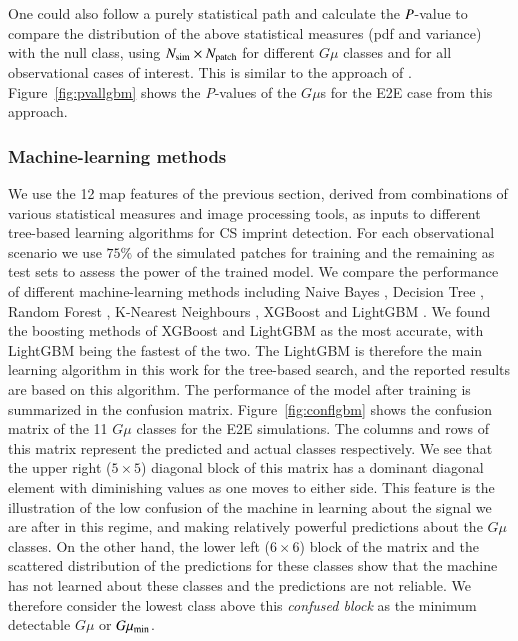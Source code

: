\documentclass[fleqn,usenatbib]{mnras}
\begin{document}
%
One could also follow a purely statistical path and calculate the ${\it P}$-value to compare the distribution of the above statistical measures (pdf and variance) 
 with the null class, using $N_{\rm sim} \times N_{\rm patch}$ for different $G\mu$ classes and for all observational cases of interest. 
This is similar to the approach of \cite{vaf18}. 
Figure~\ref{fig:pvallgbm} shows the {\it P}-values of the $G\mu$s for the E2E case from this approach.
\subsubsection{Machine-learning methods}\label{sec:MLmethod}
We use the 12 map features of the previous section, derived from combinations of various statistical measures and image processing tools, as inputs to different tree-based learning algorithms for CS imprint detection.
For each observational scenario we use $75\%$ of the simulated patches for training  and the remaining as test sets to assess the power of the trained model.
%
We compare the performance of different machine-learning methods including Naive Bayes \citep{ris01}, Decision Tree \citep{qui86}, Random Forest \citep{bre01}, K-Nearest Neighbours \citep{kel85}, XGBoost \citep{che16} and LightGBM \citep{ke17} .
%
We found the boosting methods of XGBoost and LightGBM as the most accurate, with LightGBM being the fastest of the two. The LightGBM is therefore the main learning algorithm in this work for the tree-based search, and the reported results are based on this algorithm.
The performance of the model after training is summarized in the confusion matrix.
Figure~\ref{fig:conflgbm} shows the confusion matrix of the 11 $G\mu$ classes for the E2E simulations. The columns and rows of this matrix represent the predicted and actual classes respectively. 
We see that the upper right ($5\times5$) diagonal block of this matrix has a dominant diagonal element with diminishing values as one moves to either side. This feature is the illustration of the low confusion of the machine in learning about the signal we are after in this regime, and making relatively powerful predictions about the $G\mu$ classes. 
On the other hand, the lower left ($6\times6$)  block of the matrix and the scattered distribution of the predictions for these classes show that the machine has not learned about these classes and the predictions are not reliable. We therefore consider the lowest class above this {\it confused block} as the minimum detectable $G\mu$ or $G\mu_{\rm min}$. 
\end{document}

